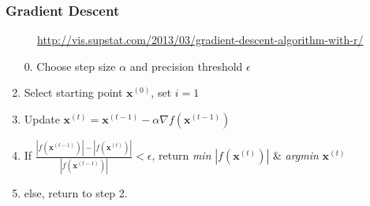 \documentclass[xcolor={dvipsnames}]{beamer}
\begin{document}
\frame
{
\frametitle{Gradient Descent}

\footnotesize
\begin{figure}
\centering
\url{http://vis.supstat.com/2013/03/gradient-descent-algorithm-with-r/}
\end{figure}
\normalsize

\begin{enumerate}
\item[0.] Choose step size $\alpha$ and precision threshold $\epsilon$
\item Select starting point ${\boldsymbol x^{(0)}}$, set $i = 1$
\item Update ${\boldsymbol x^{(t)} = {\boldsymbol x}^{(t-1)}} - \alpha \nabla f({\boldsymbol x^{(t-1)}})$
\item If $\frac{|f({\boldsymbol x}^{(t-1)})| - |f({\boldsymbol x}^{(t)})|}{|f({\boldsymbol x}^{(t-1)})|} < \epsilon$, return \emph{min} $|f({\boldsymbol x}^{(t)})|$  \& \emph{argmin} ${\boldsymbol x}^{(t)}$ 
\item else, return to step 2. $ \quad\quad$ 
\item[]
\end{enumerate}


}
\end{document}
